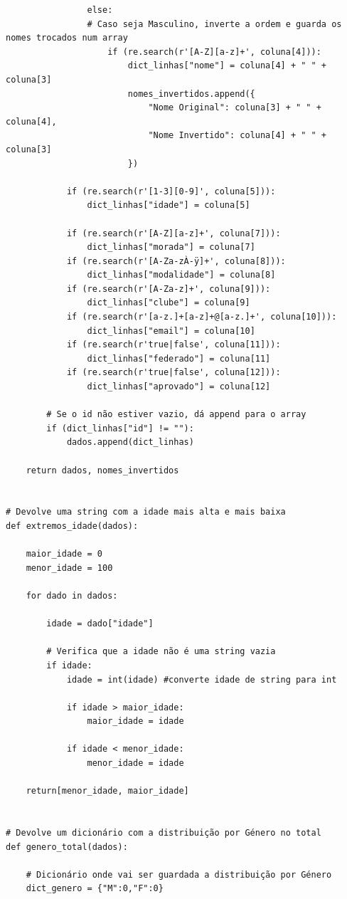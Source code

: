 \documentclass[11pt,a4paper]{report}%
\begin{document}
\begin{verbatim}
                else:
                # Caso seja Masculino, inverte a ordem e guarda os nomes trocados num array
                    if (re.search(r'[A-Z][a-z]+', coluna[4])):
                        dict_linhas["nome"] = coluna[4] + " " + coluna[3]
                        nomes_invertidos.append({
                            "Nome Original": coluna[3] + " " + coluna[4],
                            "Nome Invertido": coluna[4] + " " + coluna[3]
                        })

            if (re.search(r'[1-3][0-9]', coluna[5])):
                dict_linhas["idade"] = coluna[5]
            
            if (re.search(r'[A-Z][a-z]+', coluna[7])):
                dict_linhas["morada"] = coluna[7]
            if (re.search(r'[A-Za-zÀ-ÿ]+', coluna[8])):
                dict_linhas["modalidade"] = coluna[8]
            if (re.search(r'[A-Za-z]+', coluna[9])):
                dict_linhas["clube"] = coluna[9]
            if (re.search(r'[a-z.]+[a-z]+@[a-z.]+', coluna[10])):
                dict_linhas["email"] = coluna[10]
            if (re.search(r'true|false', coluna[11])):
                dict_linhas["federado"] = coluna[11]
            if (re.search(r'true|false', coluna[12])):
                dict_linhas["aprovado"] = coluna[12]

        # Se o id não estiver vazio, dá append para o array
        if (dict_linhas["id"] != ""):
            dados.append(dict_linhas)

    return dados, nomes_invertidos


# Devolve uma string com a idade mais alta e mais baixa
def extremos_idade(dados):

    maior_idade = 0
    menor_idade = 100

    for dado in dados:

        idade = dado["idade"]

        # Verifica que a idade não é uma string vazia
        if idade:
            idade = int(idade) #converte idade de string para int

            if idade > maior_idade:
                maior_idade = idade
            
            if idade < menor_idade:
                menor_idade = idade

    return[menor_idade, maior_idade]


# Devolve um dicionário com a distribuição por Género no total
def genero_total(dados):

    # Dicionário onde vai ser guardada a distribuição por Género
    dict_genero = {"M":0,"F":0}


\end{verbatim}
\end{document}
